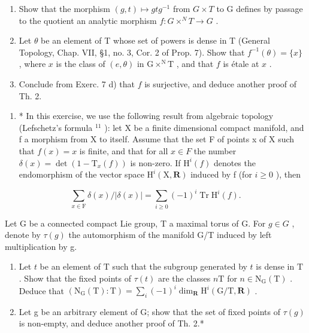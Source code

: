 \begin{enumerate}
\def\labelenumi{\alph{enumi})}
\item
  Show that the morphism \((g, t) \mapsto gtg^{-1}\) from \(G \times T\) to G defines by passage to the quotient an analytic morphism \(f : G \times^{N} T \to G\) .
\item
  Let \(\theta\) be an element of T whose set of powers is dense in T (General Topology, Chap. VII, §1, no. 3, Cor. 2 of Prop. 7). Show that \(f^{-1}(\theta) = \{x\}\) , where \(x\) is the class of \((e,\theta)\) in \(\mathrm{G} \times^{\mathrm{N}}\mathrm{T}\) , and that \(f\) is étale at \(x\) .
\item
  Conclude from Exerc. 7 d) that \(f\) is surjective, and deduce another proof of Th. 2.
\end{enumerate}

\begin{enumerate}
\def\labelenumi{\arabic{enumi})}
\setcounter{enumi}{9}
\tightlist
\item
  * In this exercise, we use the following result from algebraic topology (Lefschetz's formula \(^{11}\) ): let X be a finite dimensional compact manifold, and f a morphism from X to itself. Assume that the set F of points x of X such that \(f(x) = x\) is finite, and that for all \(x \in F\) the number \(\delta(x) = \det(1 - \mathrm{T}_{x}(f))\) is non-zero. If \(\mathrm{H}^{i}(f)\) denotes the endomorphism of the vector space \(\mathrm{H}^{i}(\mathrm{X}, \mathbf{R})\) induced by f (for \(i \geq 0\) ), then
\end{enumerate}

\[
\sum_ {x \in \mathrm{F}} \delta (x) / | \delta (x) | = \sum_ {i \geq 0} (- 1) ^ {i} \operatorname{Tr} \mathrm{H} ^ {i} (f).
\]

Let G be a connected compact Lie group, T a maximal torus of G. For \(g \in G\) , denote by \(\tau(g)\) the automorphism of the manifold G/T induced by left multiplication by g.

\begin{enumerate}
\def\labelenumi{\alph{enumi})}
\item
  Let \(t\) be an element of \(\mathrm{T}\) such that the subgroup generated by \(t\) is dense in \(\mathrm{T}\) . Show that the fixed points of \(\tau(t)\) are the classes \(n\mathrm{T}\) for \(n \in \mathrm{N}_{\mathrm{G}}(\mathrm{T})\) . Deduce that \((\mathrm{N}_{\mathrm{G}}(\mathrm{T}):\mathrm{T}) = \sum_{i}(-1)^{i}\dim_{\mathbf{R}}\mathrm{H}^{i}(\mathrm{G / T},\mathbf{R})\) .
\item
  Let g be an arbitrary element of G; show that the set of fixed points of \(\tau(g)\) is non-empty, and deduce another proof of Th. 2.*
\end{enumerate}

